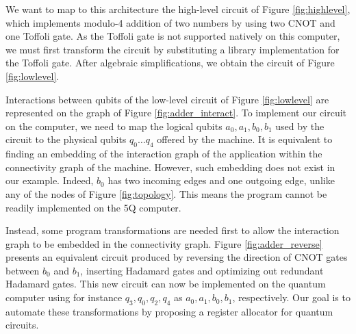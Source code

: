 \documentclass[11pt,a4paper]{article}
\begin{document}
We want to map to this architecture the high-level circuit of Figure \ref{fig:highlevel}, which implements modulo-4 addition of two numbers by using two CNOT and one Toffoli gate.
As the Toffoli gate is not supported natively on this computer, we must first transform the circuit by substituting a library implementation for the Toffoli gate. After algebraic simplifications, we obtain the circuit of Figure \ref{fig:lowlevel}.

Interactions between qubits of the low-level circuit of Figure \ref{fig:lowlevel} are represented on the graph of Figure \ref{fig:adder_interact}.
To implement our circuit on the computer, we need to map the logical qubits $a_0, a_1, b_0, b_1$ used by the circuit to the physical qubits $q_0 \dots q_4$ offered by the machine.
It is equivalent to finding an embedding of the interaction graph of the application within the connectivity graph of the machine.
However, such embedding does not exist in our example. Indeed, $b_0$ has two incoming edges and one outgoing edge, unlike any of the nodes of Figure \ref{fig:topology}.
This means the program cannot be readily implemented on the 5Q computer.

Instead, some program transformations are needed first to allow the interaction graph to be embedded in the connectivity graph.
Figure \ref{fig:adder_reverse} presents an equivalent circuit produced by reversing the direction of CNOT gates between $b_0$ and $b_1$, inserting Hadamard gates and optimizing out redundant Hadamard gates.
This new circuit can now be implemented on the quantum computer using for instance $q_3, q_0, q_2, q_4$ as $a_0, a_1, b_0, b_1$, respectively.
Our goal is to automate these transformations by proposing a register allocator for quantum circuits.
\end{document}
